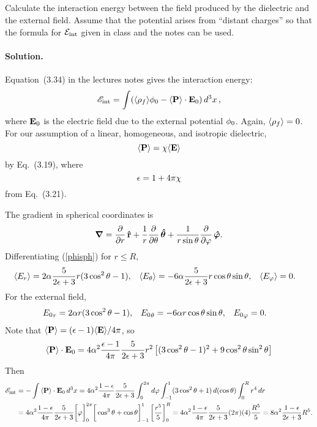 \documentclass[11pt]{article}
\newcommand{\vfix}{\vspace{-\baselineskip}}
\newcommand{\refeq}[1]{(\ref{#1})}
\newcommand{\beq}{\begin{equation*}}
\newcommand{\eeq}{\end{equation*}}
\newenvironment{problem}
{
	\subsection{}
	\color{darkgray}
    \ignorespaces
}
{

}
\newenvironment{solution}
{
    \paragraph{Solution.}
    \ignorespaces
}
{
    \bigskip
}
\begin{document}
\newcommand{\sE}{\mathscr{E}}
\newcommand{\sEint}{\sE_\text{int}}
\newcommand{\vEo}{\vE_0}
\newcommand{\dcx}{\dd[3]{x}}
\newcommand{\rh}{\vb{\hat{r}}}
\newcommand{\thh}{\boldsymbol{\hat{\tht}}}
\newcommand{\phh}{\boldsymbol{\hat{\vph}}}
\newcommand{\sint}{\sin\tht}
\newcommand{\Eth}{E_\tht}
\newcommand{\Eph}{E_\vph}
\newcommand{\evEth}{\ev{\Eth}}
\newcommand{\evEph}{\ev{\Eph}}
\newcommand{\Eo}{E_0}
\newcommand{\Eor}{{\Eo}_r}
\newcommand{\Eoth}{{\Eo}_\tht}
\newcommand{\Eoph}{{\Eo}_\vph}

\newcommand{\evPr}{\ev{P_r}}
\newcommand{\evPth}{\ev{P_\tht}}
\newcommand{\evPph}{\ev{P_\vph}}
\newcommand{\dph}{\dd{\vph}}
\newcommand{\dct}{\dd{(\cost)}}
\newcommand{\dr}{\dd{r}}
\newcommand{\intRi}{\int_R^\infty}

\begin{problem}
	Calculate the interaction energy between the field produced by the dielectric and the external field.  Assume that the potential arises from ``distant charges'' so that the formula for $\mathcal{E}_\text{int}$ given in class and the notes can be used.
\end{problem}

\begin{solution}
	Equation~(3.34) in the lectures notes gives the interaction energy:
	\beq
		\sEint = \int (\evrhof \!\phio - \evP \cdot \vEo) \dcx,
	\eeq
	where $\vEo$ is the electric field due to the external potential $\phi_0$.  Again, $\evrhof = 0$.  For our assumption of a linear, homogeneous, and isotropic dielectric,
	\beq
		\evP = \chi \!\evE
	\eeq
	by Eq.~(3.19), where
	\beq
		\eps = 1 + 4\pi \chi
	\eeq
	from Eq.~(3.21).
	
	The gradient in spherical coordinates is
	\beq
		\grad = \pdv{}{r} \,\rh + \frac{1}{r} \pdv{}{\tht} \,\thh + \frac{1}{r \sint} \pdv{}{\vph} \, \phh.
	\eeq
	Differentiating \refeq{phisph} for $r \leq R$,
	\begin{align*}
		\evEr &= 2 \alp \frac{5}{2\eps + 3} r (3 \cos^2\tht - 1), &
		\evEth &= -6 \alp \frac{5}{2\eps + 3} r \cost \sint, &
		\evEph &= 0.
	\end{align*}
	For the external field,
	\begin{align*}
		\Eor &= 2 \alp r (3 \cos^2\tht - 1), &
		\Eoth &= -6 \alp r \cost \sint, &
		\Eoph &= 0.
	\end{align*}
	Note that $\evP = (\eps - 1) \!\evE\! / 4 \pi$, so
	\beq
		\evP \cdot \vEo = 4 \alp^2 \frac{\eps - 1}{4\pi} \frac{5}{2\eps + 3} r^2 \left[ (3 \cos^2\tht - 1)^2 + 9 \cos^2\tht \sin^2\tht \right]
	\eeq
	Then
	\begin{align*}
		\sEint &= -\int \evP \cdot \vEo \dcx
		= 4 \alp^2 \frac{1 - \eps}{4\pi} \frac{5}{2\eps + 3} \intotp \dph \intono (3 \cos^2\tht + 1) \dct \intoR r^4 \dr \\
		&= 4 \alp^2 \frac{1 - \eps}{4\pi} \frac{5}{2\eps + 3} \bigg[ \vph \bigg]_0^{2\pi} \bigg[ \cos^3\tht + \cost \bigg]_{-1}^1 \left[ \frac{r^5}{5} \right]_0^R
		= 4 \alp^2 \frac{1 - \eps}{4\pi} \frac{5}{2\eps + 3} (2\pi) (4) \frac{R^5}{5}
		= 8 \alp^2 \frac{1 - \eps}{2\eps + 3} R^5.
	\end{align*}
\end{solution}
\vfix
\end{document}

